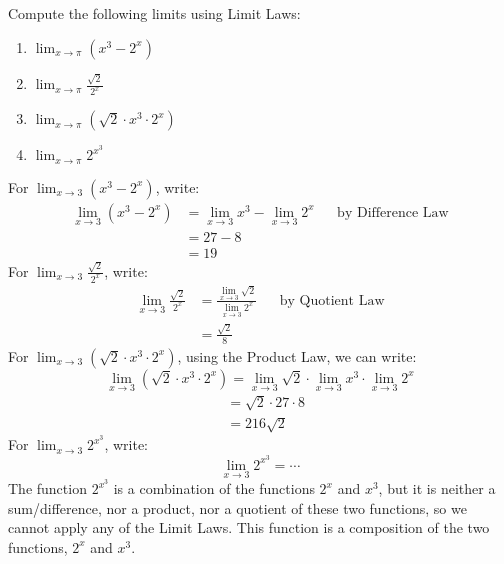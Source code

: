 \documentclass{ximera}
\begin{document}
\begin{example}
  Compute the following limits using Limit Laws:
  \begin{enumerate}
  \item\label{lle1a} $\lim_{x\to \pi} (x^3-2^x)$
  \item\label{lle1b} $\lim_{x\to \pi} \frac{\sqrt{2}}{2^x}$
  \item\label{lle1c} $\lim_{x\to \pi} (\sqrt{2}\cdot x^3\cdot 2^{x})$
  \item\label{lle1d} $\lim_{x\to \pi} 2^{x^3}$
  \end{enumerate}
  \begin{explanation}
    For $\lim_{x\to 3} (x^3-2^x)$, write:
    \begin{align*}
      \lim_{x\to 3} (x^3-2^x)&=\lim_{x\to 3} x^3-\lim_{x\to 3}2^x && \text{by Difference Law}\\
      &=27-8\\
      &=19
    \end{align*}
    For $\lim_{x\to 3} \frac{\sqrt{2}}{2^x}$, write:
    \begin{align*}
      \lim_{x\to 3} \frac{\sqrt{2}}{2^x}&=\frac{\lim_{x\to 3}\sqrt{2}}{\lim_{x\to 3}2^x} && \text{by Quotient Law}\\
      &=\frac{\sqrt{2}}{8}
    \end{align*}
    For $\lim_{x\to 3} (\sqrt{2}\cdot x^3\cdot 2^x)$, using the Product Law, we can write:
    \[
    \lim_{x\to 3} (\sqrt{2}\cdot x^3\cdot 2^x)=\lim_{x\to 3} \sqrt{2}\cdot \lim_{x\to 3}x^3\cdot \lim_{x\to 3}2^x
    \]
    \begin{align*}
      &=\sqrt{2}\cdot 27\cdot 8\\
      &=216\sqrt{2}
    \end{align*}
    For $\lim_{x\to 3} 2^{x^3}$, write:
    \[
    \lim_{x\to 3} 2^{x^3}= \cdots 
    \]
    The function $2^{x^3}$ is a combination of the functions
    $2^x$ and $x^3$, but it is neither a sum/difference, nor a
    product, nor a quotient of these two functions, so we cannot apply
    any of the Limit Laws. This function is a composition of the two
    functions, $2^x$ and $x^3$.
  \end{explanation}
\end{example}
\end{document}
